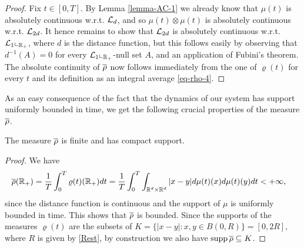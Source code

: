 \begin{proof}
	Fix $t\in [0,T]$. By Lemma \ref{lemma-AC-1} we already know that $\mu(t)$ is absolutely continuous w.r.t.
	$\mathcal{L}_d$, and so $\mu(t)\otimes\mu(t)$ is absolutely continuous w.r.t. $\mathcal{L}_{2d}$. It hence
	remains to show that $\mathcal{L}_{2d}$ is absolutely continuous w.r.t. $\mathcal{L}_1\llcorner_{\mathbb{R}_+}$, where $d$ is the distance function,
	but this follows easily by observing that $d^{-1}(A)=0$ for every $\mathcal{L}_1\llcorner_{\mathbb{R}_+}$-null set $A$, and an application of Fubini's theorem.	
	The absolute continuity of $\overline\rho$ now follows immediately from the one of $\varrho(t)$ for every $t$ and its
	definition as an integral average \eqref{eq-rho-4}.
\end{proof}

As an easy consequence of the fact that the dynamics of our system has support uniformly bounded in time, we get the following crucial properties of the measure $\overline\rho$.

\begin{lemma}\label{rhocompact}
	The measure $\overline\rho$ is finite and has compact support.
\end{lemma}

\begin{proof}
We have
\begin{align*}
\begin{split}
\overline\rho(\mathbb{R}_+)&= \frac{1}{T}\int_0^T \varrho(t)(\mathbb{R}_+)dt 
= \frac{1}{T}\int_0^T \int_{\mathbb{R}^d \times \mathbb{R}^d} |x - y| d\mu(t)(x) d \mu(t)(y)dt
<+\infty,
\end{split}
\end{align*}
since the distance function is continuous and the support of $\mu$ is uniformly bounded in time. This shows that $\overline\rho$ is bounded.
Since the supports of the measures $\varrho(t)$ are the subsets of
$K=\{|x-y|:x,y\in B(0,R)\} = [0,2R]$, where $R$ is given by \eqref{Rest}, by construction we also have $\operatorname{supp} \overline\rho\subseteq K$.
\end{proof}

